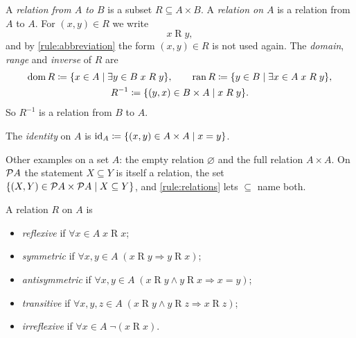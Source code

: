 \begin{definition}[Relation]
\label{def:relation}
A \emph{relation from $A$ to $B$} is a subset $R \subseteq A \times B$. A
\emph{relation on $A$} is a relation from $A$ to $A$. For $(x, y) \in R$ we write
\[
  x \mathrel{R} y,
\]
and by \cref{rule:abbreviation} the form $(x, y) \in R$ is not used again. The
\emph{domain}, \emph{range} and \emph{inverse} of $R$ are
\begin{gather*}
  \operatorname{dom} R \coloneqq \lbrace x \in A \mid \exists y \in B\; x \mathrel{R} y \rbrace, \qquad
  \operatorname{ran} R \coloneqq \lbrace y \in B \mid \exists x \in A\; x \mathrel{R} y \rbrace, \\
  R^{-1} \coloneqq \lbrace (y, x) \in B \times A \mid x \mathrel{R} y \rbrace.
\end{gather*}
So $R^{-1}$ is a relation from $B$ to $A$.
\end{definition}

\begin{definition}
\label{def:identity}
The \emph{identity} on $A$ is $\mathrm{id}_A \coloneqq \lbrace (x, y) \in A \times A \mid x =
y \rbrace$.
\end{definition}

Other examples on a set $A$: the empty relation $\varnothing$ and the full
relation $A \times A$. On $\mathcal{P} A$ the statement $X \subseteq Y$ is itself a
relation, the set $\lbrace (X, Y) \in \mathcal{P} A \times \mathcal{P} A \mid X \subseteq Y \rbrace$, and
\cref{rule:relations} lets $\subseteq$ name both.

\begin{definition}
\label{def:relation-properties}
A relation $R$ on $A$ is
\begin{itemize}
  \item \emph{reflexive} if $\forall x \in A\; x \mathrel{R} x$;
  \item \emph{symmetric} if $\forall x, y \in A\; (x \mathrel{R} y \Rightarrow y
    \mathrel{R} x)$;
  \item \emph{antisymmetric} if $\forall x, y \in A\; (x \mathrel{R} y \land y
    \mathrel{R} x \Rightarrow x = y)$;
  \item \emph{transitive} if $\forall x, y, z \in A\; (x \mathrel{R} y \land y
    \mathrel{R} z \Rightarrow x \mathrel{R} z)$;
  \item \emph{irreflexive} if $\forall x \in A\; \lnot(x \mathrel{R} x)$.
\end{itemize}
\end{definition}

